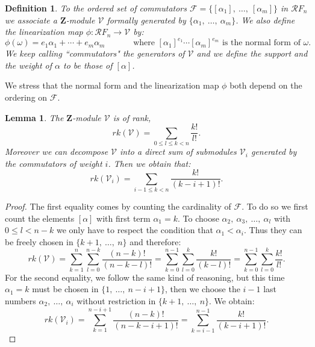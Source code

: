 \documentclass[11pt, a4paper, twoside,reqno]{amsart}
\newtheorem{lem}[thm]{Lemma}
\newtheorem{defn}[thm]{Definition}
\newtheorem{rmq}[thm]{Remark}
\begin{document}
\begin{defn}\label{deflinearization}
To the ordered set of commutators $\mathcal{F}=\{ [\alpha_1],\ \ldots,\ [\alpha_m]\}$ in $\mathcal RF_n$  we associate a $\mathbf Z$-module $\mathcal V$ formally generated by $\{\alpha_1,\ \ldots,\ \alpha_m\}$. We also define the linearization map $\phi:\mathcal RF_n\rightarrow\mathcal V$ by:
\[\phi(\omega)=e_1\alpha_1+\cdots+e_m\alpha_m\quad\quad\quad\mbox{ where }[\alpha_1]^{e_1}\cdots[\alpha_m]^{e_m}\mbox{ is the normal form of }\omega. \]
We keep calling “commutators" the generators of $\mathcal V$ and we define the support and the weight of $\alpha$ to be those of $[\alpha]$. 
\end{defn}
We stress that the normal form and the linearization map $\phi$ both depend on the ordering on $\mathcal F$. 
\begin{lem}\label{lemrank}
The $\mathbf Z$-module $\mathcal V$ is of rank, $$rk(\mathcal{V})=\sum_{0\leq l\leq k<n}\frac{k!}{l!}.$$
Moreover we can decompose $\mathcal V$ into a direct sum of submodules $\mathcal V_i$ generated by the commutators of weight $i$. Then we obtain that: \[rk(\mathcal{V}_i)=\sum_{i-1\leq k< n}\frac{k!}{(k-i+1)!}.\]
\end{lem}
\begin{proof}
The first equality comes by counting the cardinality of $\mathcal F$. To do so we first count the elements $[\alpha]$ with first term $\alpha_1=k$. To choose $\alpha_2,\ \alpha_3,\ \ldots,\  \alpha_l$ with $0\leq l<n-k$ we only have to respect the condition that $\alpha_1<\alpha_i$. Thus they can be freely chosen in $\{k+1,\ \ldots,\ n\}$ and therefore: 
$$rk(\mathcal{V})=\sum_{k=1}^n\sum_{l=0}^{n-k}\frac{(n-k)!}{(n-k-l)!}=\sum_{k=0}^{n-1}\sum_{l=0}^{k}\frac{k!}{(k-l)!}=\sum_{k=0}^{n-1}\sum_{l=0}^{k}\frac{k!}{l!}.$$
For the second equality, we follow the same kind of reasoning, but this time $\alpha_1=k$ must be chosen in $\{1,\ \ldots,\ n-i+1\}$, then we choose the $i-1$ last numbers $\alpha_2,\ \ldots,\ \alpha_i$ without restriction in $\{k+1,\ \ldots,\ n\}$. We obtain:
$$rk(\mathcal{V}_i)
=\sum_{k=1}^{n-i+1}\frac{(n-k)!}{(n-k-i+1)!}=\sum_{k=i-1}^{n-1}\frac{k!}{(k-i+1)!}.$$
\end{proof}
\end{document}
